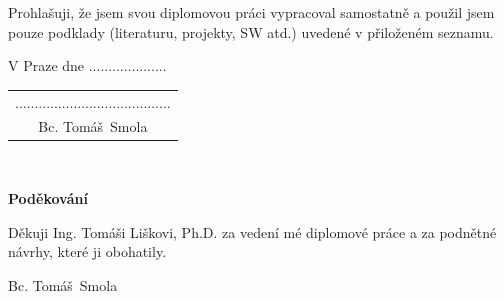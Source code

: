 \documentclass[a4paper,11pt]{report}
\newcommand{\autor}{Bc. Tomáš~Smola}           %
\begin{document}
\vspace{0.5cm} %
Prohlašuji, že jsem svou diplomovou práci vypracoval samostatně a použil jsem pouze podklady
(literaturu, projekty, SW atd.) uvedené v přiloženém seznamu.

\vspace{5mm}V Praze dne ....................\hfill  %
    \begin{tabular}{c}                               %
    ........................................\\       %
    \autor                                           %
    \end{tabular}                                    %

\newpage
\thispagestyle{empty}

~
\vfill %

{\bf Poděkování}

\vspace{5mm} %
Děkuji Ing. Tomáši Liškovi, Ph.D. za vedení mé diplomové práce a za podnětné návrhy, které ji obohatily.

\begin{flushright}
\autor
\end{flushright}  %

\newpage   %
\thispagestyle{empty}   %

\newbox\odstavecbox
\newlength\vyskaodstavce
\newcommand\odstavec[2]{%
    \setbox\odstavecbox=\hbox{%
         \parbox[t]{#1}{#2\vrule width 0pt depth 4pt}}%
    \global\vyskaodstavce=\dp\odstavecbox
    \box\odstavecbox}
\newcommand{\delka}{120mm} %
\end{document}
